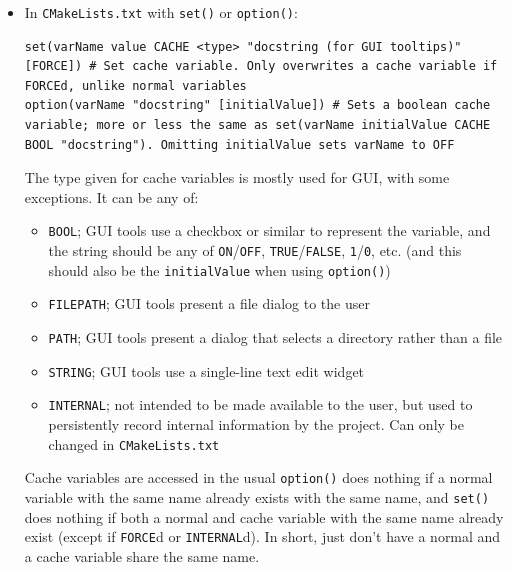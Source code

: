 \documentclass[table, xcdraw]{article}%
\begin{document}
\begin{itemize}
    \item In \texttt{CMakeLists.txt} with \texttt{set()} or \texttt{option()}:
    
    \begin{verbatim}
set(varName value CACHE <type> "docstring (for GUI tooltips)" [FORCE]) # Set cache variable. Only overwrites a cache variable if FORCEd, unlike normal variables
option(varName "docstring" [initialValue]) # Sets a boolean cache variable; more or less the same as set(varName initialValue CACHE BOOL "docstring"). Omitting initialValue sets varName to OFF
    \end{verbatim}
    
    The type given for cache variables is mostly used for GUI, with some exceptions. It can be any of:
    
    \begin{itemize}
        \item \texttt{BOOL}; GUI tools use a checkbox or similar to represent the
    variable, and the string should be any of \texttt{ON}/\texttt{OFF}, \texttt{TRUE}/\texttt{FALSE}, \texttt{1}/\texttt{0}, etc. (and this should also be the \texttt{initialValue} when using \texttt{option()})
        \item \texttt{FILEPATH}; GUI tools present a file dialog to the user
        \item \texttt{PATH}; GUI tools present a dialog that selects a directory rather than a file
        \item \texttt{STRING}; GUI tools use a single-line text edit widget
        \item \texttt{INTERNAL}; not intended to be made available to the user, but used to persistently record internal information by the project. Can only be changed in \texttt{CMakeLists.txt}
    \end{itemize}
    
    Cache variables are accessed in the usual %
    \texttt{option()} does nothing if a normal variable with the same name already exists with the same name, and \texttt{set()} does nothing if both a normal and cache variable with the same name already exist (except if \texttt{FORCE}d or \texttt{INTERNAL}d). In short, just don't have a normal and a cache variable share the same name.
    

\end{itemize}
\end{document}
